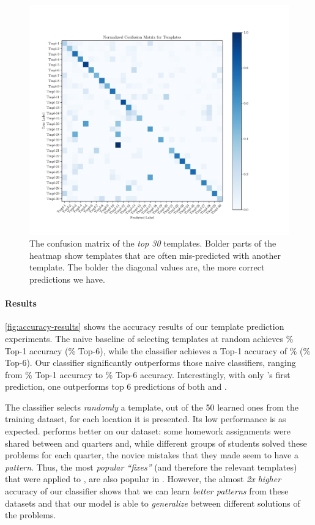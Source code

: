 \begin{figure}[t]
  \centering
  \includegraphics[trim={30 40 100 70},clip,width=\linewidth]{evaluation-conf-matrix.pdf}
  \caption{The confusion matrix of the \emph{top 30} templates. Bolder parts of
  the heatmap show templates that are often mis-predicted with another template.
  The bolder the diagonal values are, the more correct predictions we have.}
  \label{fig:conf-matrix}
\end{figure}

\paragraph{Results}
\autoref{fig:accuracy-results} shows the accuracy results of our template
prediction experiments. The naive baseline of selecting templates at random
achieves \RandomTopOne\% Top-1 accuracy (\RandomTopSix\% Top-6), while the
 \popular
classifier achieves a Top-1 accuracy of \PopularTopOne\% (\PopularTopSix\%
Top-6). Our \dnn classifier significantly outperforms those naive classifiers,
ranging from \DnnTopOne\% Top-1 accuracy to \DnnTopSix\% Top-6 accuracy.
Interestingly, with only \dnn's first prediction, one outperforms top 6
predictions of both \random and \popular.

The \random classifier selects \emph{randomly} a template, out of the 50 learned
ones from the \SPRING training dataset, for each location it is presented. Its
low performance is as expected.
\popular performs better on our dataset:
some homework assignments were
shared between \SPRING and \FALL quarters and, while different groups of
students solved these problems for each quarter, the novice mistakes that they
made seem to have a \emph{pattern}. Thus, the most \emph{popular ``fixes''} (and
therefore the relevant templates) that were applied to \SPRING, are also popular
in \FALL. However, the almost \emph{2x higher} accuracy of our \dnn classifier
shows that we can learn \emph{better patterns} from these datasets and that our
\dnn model is able to \emph{generalize} between different solutions of the
problems.

